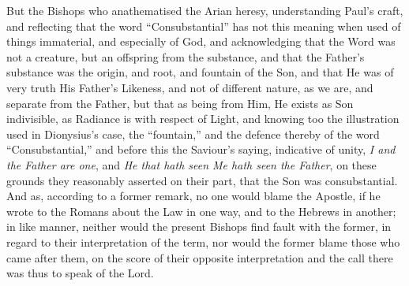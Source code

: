 But the Bishops who anathematised the Arian heresy, understanding Paul's craft, and reflecting that the word ``Consubstantial''
has not this meaning when used of things immaterial, and especially of
God, and acknowledging that the Word was not a creature, but an
offspring from the substance, and that the Father's substance was the
origin, and root, and fountain of the Son, and that He was of very
truth His Father's Likeness, and not of different nature, as we are,
and separate from the Father, but that as being from Him, He exists as
Son indivisible, as Radiance is with respect of Light, and knowing too
the illustration used in Dionysius's case, the ``fountain,'' and the
defence thereby of the word ``Consubstantial,'' and before this the
Saviour's saying, indicative of unity, \emph{I and the Father are one},
and \emph{He that hath seen Me hath seen the Father}, on these grounds
they reasonably asserted on their part, that the Son was
consubstantial. And as, according to a former remark, no one would
blame the Apostle, if he wrote to the Romans about the Law in one way,
and to the Hebrews in another; in like manner, neither would the
present Bishops find fault with the former, in regard to their
interpretation of the term, nor would the former blame those who came
after them, on the score of their opposite interpretation and the call
there was thus to speak of the Lord.

